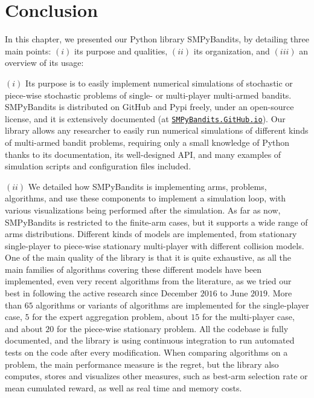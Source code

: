 {%




\newpage  %
\section{Conclusion}
\label{sec:3:conclusion}


In this chapter, we presented our Python library SMPyBandits, by detailing three main points:
$(i)$ its purpose and qualities,
$(ii)$ its organization,
and $(iii)$ an overview of its usage:
%

$(i)$
Its purpose is to easily implement numerical simulations of stochastic or piece-wise stochastic problems of single- or multi-player multi-armed bandits.
SMPyBandits is distributed on GitHub and Pypi freely, under an open-source license, and it is extensively documented (at \href{https://SMPyBandits.GitHub.io}{\texttt{SMPyBandits.GitHub.io}}).
Our library allows any researcher to easily run numerical simulations of different kinds of multi-armed bandit problems, requiring only a small knowledge of Python thanks to its documentation, its well-designed API, and many examples of simulation scripts and configuration files included.

$(ii)$
We detailed how SMPyBandits is implementing arms, problems, algorithms, and use these components to implement a simulation loop, with various visualizations being performed after the simulation.
As far as now, SMPyBandits is restricted to the finite-arm cases, but it supports a wide range of arms distributions.
Different kinds of models are implemented, from stationary single-player to piece-wise stationary multi-player with different collision models.
One of the main quality of the library is that it is quite exhaustive, as all the main families of algorithms covering these different models have been implemented, even very recent algorithms from the literature, as we tried our best in following the active research since December $2016$ to June $2019$.
More than $65$ algorithms or variants of algorithms are implemented for the single-player case, $5$ for the expert aggregation problem, about $15$ for the multi-player case, and about $20$ for the piece-wise stationary problem.
All the codebase is fully documented, and the library is using continuous integration to run automated tests on the code after every modification.
%
When comparing algorithms on a problem, the main performance measure is the regret, but the library also computes, stores and visualizes other measures, such as best-arm selection rate or mean cumulated reward, as well as real time and memory costs.

}

